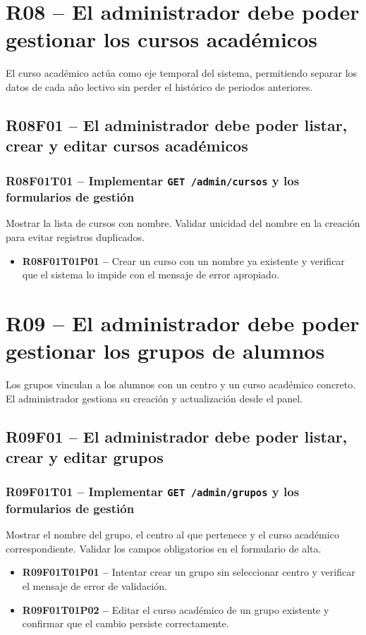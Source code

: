 \documentclass[12pt, a4paper]{report}
\begin{document}
\section{R08 -- El administrador debe poder gestionar los cursos académicos}

El curso académico actúa como eje temporal del sistema, permitiendo separar los datos de cada a\~no lectivo sin perder el histórico de periodos anteriores.

\subsection{R08F01 -- El administrador debe poder listar, crear y editar cursos académicos}

\subsubsection{R08F01T01 -- Implementar \texttt{GET /admin/cursos} y los formularios de gestión}
Mostrar la lista de cursos con nombre. Validar unicidad del nombre en la creación para evitar registros duplicados.
\begin{itemize}
  \item \textbf{R08F01T01P01 --} Crear un curso con un nombre ya existente y verificar que el sistema lo impide con el mensaje de error apropiado.
\end{itemize}

\section{R09 -- El administrador debe poder gestionar los grupos de alumnos}

Los grupos vinculan a los alumnos con un centro y un curso académico concreto. El administrador gestiona su creación y actualización desde el panel.

\subsection{R09F01 -- El administrador debe poder listar, crear y editar grupos}

\subsubsection{R09F01T01 -- Implementar \texttt{GET /admin/grupos} y los formularios de gestión}
Mostrar el nombre del grupo, el centro al que pertenece y el curso académico correspondiente. Validar los campos obligatorios en el formulario de alta.
\begin{itemize}
  \item \textbf{R09F01T01P01 --} Intentar crear un grupo sin seleccionar centro y verificar el mensaje de error de validación.
  \item \textbf{R09F01T01P02 --} Editar el curso académico de un grupo existente y confirmar que el cambio persiste correctamente.
\end{itemize}
\end{document}
